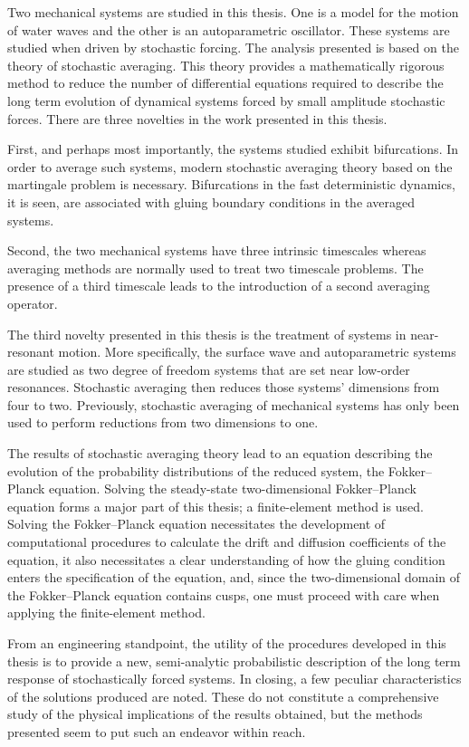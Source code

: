 
Two mechanical systems are studied in this thesis. One is a model for the motion of water waves and the other is an autoparametric oscillator. These systems are studied when driven by stochastic forcing. The analysis presented is based on the theory of stochastic averaging. This theory provides a mathematically rigorous method to reduce the number of differential equations required to describe the long term evolution of dynamical systems forced by small amplitude stochastic forces. There are three novelties in the work presented in this thesis.

First, and perhaps most importantly, the systems studied exhibit bifurcations. In order to average such systems, modern stochastic averaging theory based on the martingale problem is necessary. Bifurcations in the fast deterministic dynamics, it is seen, are associated with gluing boundary conditions in the averaged systems.

Second, the two mechanical systems have three intrinsic timescales whereas averaging methods are normally used to treat two timescale problems. The presence of a third timescale leads to the introduction of a second averaging operator.

The third novelty presented in this thesis is the treatment of systems in near-resonant motion. More specifically, the surface wave and autoparametric systems are studied as two degree of freedom systems that are set near low-order resonances. Stochastic averaging then reduces those systems' dimensions from four to two. Previously, stochastic averaging of mechanical systems has only been used to perform reductions from two dimensions to one.

The results of stochastic averaging theory lead to an equation describing the evolution of the probability distributions of the reduced system, the Fokker--Planck equation. Solving the steady-state two-dimensional Fokker--Planck equation forms a major part of this thesis; a finite-element method is used. Solving the Fokker--Planck equation necessitates the development of computational procedures to calculate the drift and diffusion coefficients of the equation, it also necessitates a clear understanding of how the gluing condition enters the specification of the equation, and, since the two-dimensional domain of the Fokker--Planck equation contains cusps, one must proceed with care when applying the finite-element method.

From an engineering standpoint, the utility of the procedures developed in this thesis is to provide a new, semi-analytic probabilistic description of the long term response of stochastically forced systems. In closing, a few peculiar characteristics of the solutions produced are noted. These do not constitute a comprehensive study of the physical implications of the results obtained, but the methods presented seem to put such an endeavor within reach.
